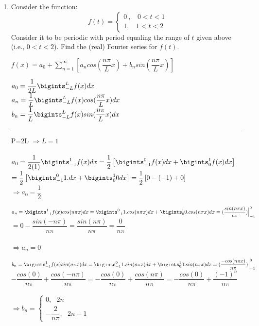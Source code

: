 \documentclass[fleqn]{article}
\begin{document}
  \begin{enumerate}
    \item Consider the function:
    \begin{equation}
      f(t)=\begin{cases}
      0~, ~~~~0< t < 1 \\
      1, ~~~~1< t< 2 
      \end{cases}
    \end{equation}
    Consider it to be periodic with period equaling the range of $t$ given above (i.e., $0<t<2$). Find the (real) Fourier series for $f(t)$.

    \textcolor{hwColor}{
      $f(x)=a_0+\sum\limits_{n=1}^{\infty}\left[a_n cos(\dfrac{n\pi}{L}x)+b_n sin(\dfrac{n\pi}{L}x)\right]$
    }

    \textcolor{hwColor}{
      $a_0=\dfrac{1}{2L}\bigints_{-L}^{L}f(x)dx$ \\
      $a_n=\dfrac{1}{L}\bigints_{-L}^{L}f(x) cos(\dfrac{n\pi}{L}x)dx$ \\
      $b_n=\dfrac{1}{L}\bigints_{-L}^{L}f(x) sin(\dfrac{n\pi}{L}x)dx$ \\
    }

    \textcolor{hwColor}{ 
      \rule{15cm}{0.4pt} 
    }

    \textcolor{hwColor}{ 
      P=2L $\Longrightarrow L=1$ \\
      \\
      $a_0=\dfrac{1}{2(1)}\bigints_{-1}^{1}f(x)dx=\dfrac{1}{2}\left[\bigints_{-1}^{0}f(x)dx+\bigints_{0}^{1}f(x)dx\right]$ \\
      $=\dfrac{1}{2}\left[\bigints_{-1}^{0}1.dx+\bigints_{0}^{1}0dx\right]=\dfrac{1}{2}\left[0-(-1)+0\right]$ \\
      $\Longrightarrow a_0=\dfrac{1}{2}$
    }

    \bigbreak

    \textcolor{hwColor}{ 
      $a_n=\bigints_{-1}^{1}f(x) cos(n\pi x)dx=\bigints_{-1}^{0}1.cos(n\pi x)dx+\bigints_{0}^{1}0.cos(n\pi x)dx=(\dfrac{sin(n\pi x)}{n\pi})\Big|_{-1}^{0}$ \\
      $=0-\dfrac{sin(-n\pi)}{n\pi}=\dfrac{sin(n\pi)}{n\pi}=\dfrac{0}{n\pi}$ \\
      \\
      $\Longrightarrow a_n=0$
    }

    \bigbreak

    \textcolor{hwColor}{ 
      $b_n=\bigints_{-1}^{1}f(x) sin(n\pi x)dx=\bigints_{-1}^{0}1.sin(n\pi x)dx+\bigints_{0}^{1}0.sin(n\pi x)dx=(\dfrac{-cos(n\pi x)}{n\pi})\Big|_{-1}^{0}$ \\
      $-\dfrac{cos(0)}{n\pi}+\dfrac{cos(-n\pi)}{n\pi}=-\dfrac{cos(0)}{n\pi}+\dfrac{cos(n\pi)}{n\pi}=-\dfrac{cos(0)}{n\pi}+\dfrac{(-1)^n}{n\pi}$\\
      \\
      $\Longrightarrow b_n=\begin{cases}
        0,~~~ 2n \\
        -\dfrac{2}{n\pi}, ~~~ 2n-1 
      \end{cases}$
    }


\end{enumerate}
\end{document}
